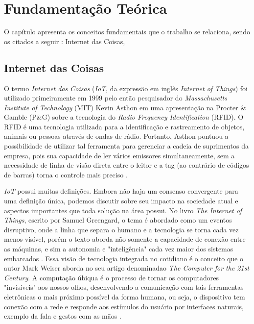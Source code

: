 \chapter{Fundamentação Teórica}

O capítulo apresenta os conceitos fundamentais que o trabalho se relaciona, sendo os citados a seguir : Internet das Coisas, 

\section{Internet das Coisas}

O termo \textit{Internet das Coisas} (\textit{IoT}, da expressão em inglês \textit{Internet of Things}) foi utilizado primeiramente em 1999 pelo então pesquisador do \textit{Massachusetts Institute of Technology} (MIT) Kevin Asthon em uma apresentação na Procter \& Gamble (P\&G) sobre a tecnologia do \textit{Radio Frequency Identification} (RFID). O RFID é uma tecnologia utilizada para a identificação e rastreamento de objetos, animais ou pessoas através de ondas de rádio. Portanto, Asthon pontuou a possibilidade de utilizar tal ferramenta para gerenciar a cadeia de suprimentos da empresa, pois sua capacidade de ler vários emissores simultaneamente, sem a necessidade de linha de visão direta entre o leitor e a tag (ao contrário de códigos de barras) torna o controle mais preciso \cite{iot-first-definition}. 

\textit{IoT} possui muitas definições. Embora não haja um consenso convergente para uma definição única, podemos discutir sobre seu impacto na sociedade atual e aspectos importantes que toda solução na área possui. No livro \textit{The Internet  of Things}, escrito por Samuel Greengard, o tema é abordado como um eventos disruptivo, onde a linha que separa o humano e a tecnologia se torna cada vez menos visível, porém o texto aborda não somente a capacidade de conexão entre as máquinas, e sim a autonomia e "inteligência" cada vez maior dos sistemas embarcados \cite[pp. 17]{book-iot}. Essa visão de tecnologia integrada no cotidiano é o conceito que o autor Mark Weiser aborda no seu artigo denominadao \textit{The Computer for the 21st Century}. A computação úbiqua é o processo de tornar os computadores "invisíveis" aos nossos olhos, desenvolvendo a comunicação com tais ferramentas eletrônicas o mais próximo possível da forma humana, ou seja, o dispositivo tem conexão com a rede e responde aos estímulos do usuário por interfaces naturais, exemplo da fala e gestos com as mãos \cite{ubiquitous-computing}.

